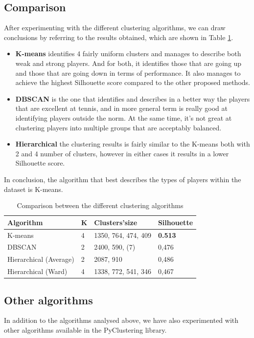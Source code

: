 \subsection{Comparison}
After experimenting with the different clustering algorithms, we can draw conclusions by referring to the results obtained, which are shown in Table \ref{tab:clustering-comparison-table}.
\begin{itemize}
	\item{ \textbf{K-means} identifies 4 fairly uniform clusters and manages to describe both weak and strong players. And for both, it identifies those that are going up and those that are going down in terms of performance. It also manages to achieve the highest Silhouette score compared to the other proposed methods.}
	\item{ \textbf{DBSCAN} is the one that identifies and describes in a better way the players that are excellent at tennis, and in more general term is really good at identifying players outside the norm. At the same time, it's not great at clustering players into multiple groups that are acceptably balanced.}
	\item{\textbf{Hierarchical} the clustering results is fairly similar to the K-means both with 2 and 4 number of clusters, however in either cases it results in a lower Silhouette score.
	}
\end{itemize}
In conclusion, the algorithm that best describes the types of players within the dataset is K-means.
\begin{table}[h]
\centering
\begin{tabular}{|l|l|l|l|}
\hline
\textbf{Algorithm}     & \textbf{K} & \textbf{Clusters'size} & \textbf{Silhouette} \\ \hline
K-means                & 4          & 1350, 764, 474, 409    & \textbf{0.513}      \\ \hline
DBSCAN                 & 2          & 2400, 590, (7)         & 0,476               \\ \hline
Hierarchical (Average) & 2          & 2087, 910              & 0,486               \\ \hline
Hierarchical (Ward)    & 4          & 1338, 772, 541, 346    & 0,467               \\ \hline
\end{tabular}
\caption{Comparison between the different clustering algorithms}
\label{tab:clustering-comparison-table}
\end{table}

\subsection{Other algorithms}
In addition to the algorithms analysed above, we have also experimented with other algorithms available in the PyClustering library. 

